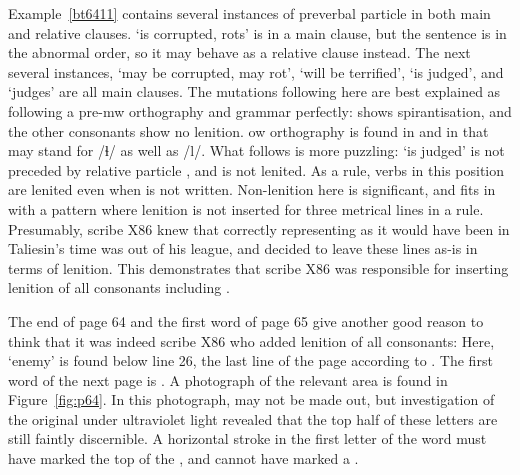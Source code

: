 Example~\ref{bt6411} contains several instances of preverbal particle  in both main and relative clauses.  `is corrupted, rots' is in a main clause, but the sentence is in the abnormal order, so it may behave as a relative clause instead. The next several instances,  `may be corrupted, may rot',  `will be terrified',  `is judged', and  `judges' are all main clauses. The mutations following  here  are best explained as following a pre-\gls{mw} orthography and grammar perfectly:  shows spirantisation, and the other consonants show no lenition. \gls{ow} orthography is found in  and  in that  may stand for /ɬ/ as well as /l/. What follows is more puzzling:  `is judged' is not preceded by relative particle , and is not lenited. As a rule, verbs in this position are lenited even when  is not written. Non-lenition here is significant, and fits in with a pattern where lenition is not inserted for three metrical lines in a rule. Presumably, scribe X86 knew that correctly representing as it would have been in Taliesin's time was out of his league, and decided to leave these lines as-is in terms of lenition. This demonstrates that scribe X86 was responsible for inserting lenition of all consonants including .


The end of page 64 and the first word of page 65 give another good reason to think that it was indeed scribe X86 who added lenition of all consonants:
Here,  `enemy' is found below line 26, the last line of the page according to \textcite{evans_facsimile_1915}. The first word of the next page is . A photograph of the relevant area is found in Figure~\ref{fig:p64}. In this photograph,  may not be made out, but investigation of the original under ultraviolet light revealed that the top half of these letters are still faintly discernible. A horizontal stroke in the first letter of the word must have marked the top of the , and cannot have marked a .  

